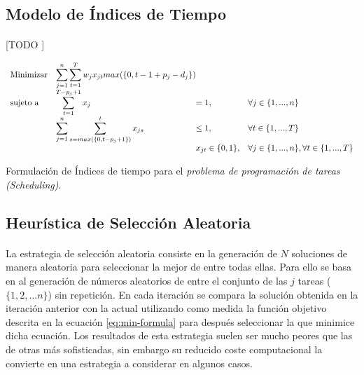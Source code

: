 \documentclass[spanish]{article}
\begin{document}
		\subsection{Modelo de Índices de Tiempo}
		\label{sec:time-index}

			\paragraph{}
			[TODO ]

			\begin{eqfloat}
				\begin{equation}
					\begin{array}{ll@{}ll}
						\text{Minimizar}	& \displaystyle\sum\limits_{j = 1}^{n}\displaystyle\sum\limits_{t = 1}^{T} w_{j}x_{jt}max(\{0, t-1+p_{j}-d_{j}\}) && \\
						\text{sujeto a}		& \displaystyle\sum\limits_{t = 1}^{T - p_{j}+ 1} x_{j} &= 1, & \forall j \in \{1,...,n\}\\
															&	\displaystyle\sum\limits_{j = 1}^{n} \displaystyle\sum\limits_{s = max(\{0,t-p_{j}+1\})}^{t} x_{js} &\leq 1, 	& \forall t \in \{1,...,T\}\\
															&                               				&	x_{jt} 	\in \{0,1\}, 	& \forall j \in \{1,...,n\},  \forall t \in \{1,...,T\}
					\end{array}
				\end{equation}
				\caption{Formulación de Índices de tiempo para el \emph{problema de programación de tareas (Scheduling)}.}
				\label{eq:time-index-formulation}
			\end{eqfloat}

		\subsection{Heurística de Selección Aleatoria}
		\label{sec:random-heuristic}

			\paragraph{}
			La estrategia de selección aleatoria consiste en la generación de $N$ soluciones de manera aleatoria para seleccionar la mejor de entre todas ellas. Para ello se basa en al generación de números aleatorios de entre el conjunto de las $j$ tareas ($\{1,2,...n\}$) sin repetición. En cada iteración se compara la solución obtenida en la iteración anterior con la actual utilizando como medida la función objetivo descrita en la ecuación \eqref{eq:min-formula} para después seleccionar la que minimice dicha ecuación. Los resultados de esta estrategia suelen ser mucho peores que las de otras más sofisticadas, sin embargo su reducido coste computacional la convierte en una estrategia a considerar en algunos casos.
\end{document}
